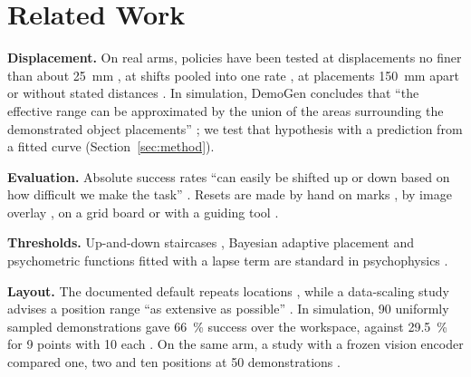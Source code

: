 \section{Related Work}
\label{sec:related}

\textbf{Displacement.}
On real arms, policies have been tested at displacements no finer than about 25~mm \cite{andresg2026demonstration}, at shifts pooled into one rate \cite{zhao2025proprioceptive}, at placements 150~mm apart \cite{xue2025demogen} or without stated distances \cite{long2026register,sumarac2026act}. %
In simulation, DemoGen concludes that ``the effective range can be approximated by the union of the areas surrounding the demonstrated object placements'' \cite{xue2025demogen}; we test that hypothesis with a prediction from a fitted curve (Section~\ref{sec:method}).

\textbf{Evaluation.}
Absolute success rates ``can easily be shifted up or down based on how difficult we make the task'' \cite{tri2025careful}.
Resets are made by hand on marks \cite{andresg2026demonstration}, by image overlay \cite{kressgazit2024robot,tri2025careful,huang2026vlareplica}, on a grid board \cite{jin2026umibench} or with a guiding tool \cite{heo2023furniturebench}.

\textbf{Thresholds.}
Up-and-down staircases \cite{dixon1948method,levitt1971transformed}, Bayesian adaptive placement \cite{watson1983quest,kontsevich1999bayesian} and psychometric functions fitted with a lapse term \cite{wichmann2001fitting} are standard in psychophysics \cite{treutwein1995adaptive,leek2001adaptive}.

\textbf{Layout.}
The documented default repeats locations \cite{huggingface2026imitation}, while a data-scaling study advises a position range ``as extensive as possible'' \cite{lin2024data}.
In simulation, 90 uniformly sampled demonstrations gave 66~\% success over the workspace, against 29.5~\% for 9 points with 10 each \cite{wang2025move}. %
On the same arm, a study with a frozen vision encoder compared one, two and ten positions at 50 demonstrations \cite{andresg2026demonstration}. %

